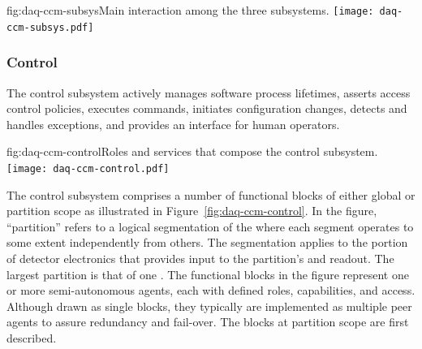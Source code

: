 \begin{dunefigure}{fig:daq-ccm-subsys}{Main interaction among the three  subsystems.}
  \texttt{[image: daq-ccm-subsys.pdf]}
\end{dunefigure}

\subsubsection{Control}
\label{sec:daq:design:ccm:control}


The  control subsystem actively manages  software process lifetimes, asserts access control policies, executes commands, initiates configuration changes, detects and handles exceptions, and provides an interface for human operators.


\begin{dunefigure}{fig:daq-ccm-control}{Roles and services that compose the  control subsystem.}
  \texttt{[image: daq-ccm-control.pdf]}
\end{dunefigure}

The control subsystem comprises a number of functional blocks of either global or partition scope as illustrated in Figure~\ref{fig:daq-ccm-control}. 
In the figure, ``partition'' refers to a logical segmentation of the  where each segment operates to some extent independently from others. 
The segmentation applies to the portion of detector electronics that provides input to the partition's  and readout. 
The largest partition %
is that of one . 
The functional blocks in the figure represent one or more semi-autonomous agents, each with defined roles, capabilities, and access. 
Although drawn as single blocks, they typically are implemented as multiple peer agents to assure redundancy and fail-over. 
The blocks at partition scope are first described.

